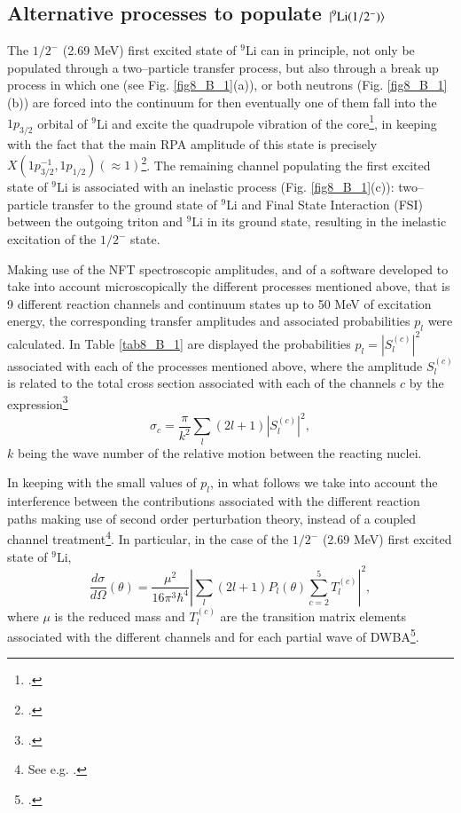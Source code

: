\begin{subappendices}
\section{Alternative processes to populate $|{^9\text{Li}(1/2^-)} \rangle$}\label{C8AppB}
The $1/2^-$ (2.69 MeV) first excited state of $^9$Li can in principle, not only be populated through a two--particle transfer process, but also through a break up process in which one (see Fig. \ref{fig8_B_1}(a)), or both neutrons (Fig. \ref{fig8_B_1}(b)) are forced into the continuum for then eventually one of them fall into the $1p_{3/2}$ orbital of $^9$Li and excite the quadrupole vibration of the core\footnote{\cite{Potel:10}.}, in keeping with the fact that the main RPA amplitude of this state is precisely $X(1p^{-1}_{3/2},1p_{1/2})(\approx 1)$\footnote{\cite{Barranco:01}.}. The remaining channel populating the first excited state of $^9$Li is associated with an inelastic process (Fig. \ref{fig8_B_1}(c)): two--particle transfer to the ground state of $^{9}$Li and Final State Interaction (FSI) between the outgoing triton and $^{9}$Li in its ground state, resulting in the inelastic excitation of  the $1/2^-$ state.


Making use of the NFT spectroscopic amplitudes, and of a software developed  to take into account microscopically  the different processes mentioned above, that is 9 different reaction channels and continuum states up to 50 MeV of excitation energy, the corresponding transfer amplitudes and associated probabilities $p_l$ were calculated.
 In Table \ref{tab8_B_1} are displayed the probabilities $p_l=|S_l^{(c)}|^2$ associated with each of the processes mentioned above, where the amplitude $S_l^{(c)}$ is related to the total cross section associated with each of the channels $c$  by the expression\footnote{\cite{Satchler:80,Landau:81}.}
\begin{equation}\label{eq6B1}
    \sigma_c=\frac{\pi}{k^2}\sum_l(2l+1)|S_l^{(c)}|^2,
\end{equation}
$k$ being the wave number of the relative motion between the reacting nuclei.



 In keeping with the small values of $p_l$, in what follows we take into account the interference between the contributions associated with the different reaction paths making use of second order perturbation theory, instead of a coupled channel treatment\footnote{See e.g.  \cite{Ascuitto:69} \cite{Tamura:70} \cite{Khoa:04} \cite{Keeley:07b} \cite{Thompson:88}.}. In particular, in the case of the $1/2^-$ (2.69 MeV) first excited state of $^9$Li,
\begin{equation}
    \frac{d\sigma}{d\Omega}(\theta)=\frac{\mu^2}{16\pi^3\hbar^4}\left|\sum_l(2l+1)P_l(\theta)\sum_{c=2}^5 T^{(c)}_l\right|^2,
\end{equation}
where $\mu$ is the reduced mass and $T^{(c)}_l$ are the transition matrix elements associated with the different channels and for each partial wave of DWBA\footnote{\cite{Satchler:80}.}.


\end{subappendices}
